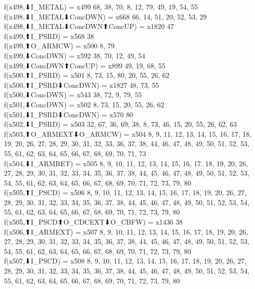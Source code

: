 f(x498,⬇I_METAL) = x499 {68, 38, 70, 8, 12, 79, 49, 19, 54, 55} \\
f(x498,⬇I_METAL⬇ConcDWN) = x668 {66, 14, 51, 20, 52, 53, 29} \\
f(x498,⬇I_METAL⬇ConcDWN⬆ConcUP) = x1820 {47} \\
f(x499,⬆I_PSRD) = x568 {38} \\
f(x499,⬆O_ARMCW) = x500 {8, 79} \\
f(x499,⬇ConcDWN) = x592 {38, 70, 12, 49, 54} \\
f(x499,⬇ConcDWN⬆ConcUP) = x899 {49, 19, 68, 55} \\
f(x500,⬆I_PSRD) = x501 {8, 73, 15, 80, 20, 55, 26, 62} \\
f(x500,⬆I_PSRD⬇ConcDWN) = x1827 {48, 73, 55} \\
f(x500,⬇ConcDWN) = x543 {38, 72, 9, 79, 55} \\
f(x501,⬇ConcDWN) = x502 {8, 73, 15, 20, 55, 26, 62} \\
f(x501,⬇I_PSRD⬇ConcDWN) = x570 {80} \\
f(x502,⬇I_PSRD) = x503 {32, 67, 36, 69, 38, 8, 73, 46, 15, 20, 55, 26, 62, 63} \\
f(x503,⬆O_ARMEXT⬇O_ARMCW) = x504 {8, 9, 11, 12, 13, 14, 15, 16, 17, 18, 19, 20, 26, 27, 28, 29, 30, 31, 32, 33, 36, 37, 38, 44, 46, 47, 48, 49, 50, 51, 52, 53, 55, 61, 62, 63, 64, 65, 66, 67, 68, 69, 70, 71, 73} \\
f(x504,⬇I_ARMRET) = x505 {8, 9, 10, 11, 12, 13, 14, 15, 16, 17, 18, 19, 20, 26, 27, 28, 29, 30, 31, 32, 33, 34, 35, 36, 37, 38, 44, 45, 46, 47, 48, 49, 50, 51, 52, 53, 54, 55, 61, 62, 63, 64, 65, 66, 67, 68, 69, 70, 71, 72, 73, 79, 80} \\
f(x505,⬆I_PSCD) = x506 {8, 9, 10, 11, 12, 13, 14, 15, 16, 17, 18, 19, 20, 26, 27, 28, 29, 30, 31, 32, 33, 34, 35, 36, 37, 38, 44, 45, 46, 47, 48, 49, 50, 51, 52, 53, 54, 55, 61, 62, 63, 64, 65, 66, 67, 68, 69, 70, 71, 72, 73, 79, 80} \\
f(x505,⬆I_PSCD⬆O_CDCEXT⬇O_CBFW) = x1436 {38} \\
f(x506,⬆I_ARMEXT) = x507 {8, 9, 10, 11, 12, 13, 14, 15, 16, 17, 18, 19, 20, 26, 27, 28, 29, 30, 31, 32, 33, 34, 35, 36, 37, 38, 44, 45, 46, 47, 48, 49, 50, 51, 52, 53, 54, 55, 61, 62, 63, 64, 65, 66, 67, 68, 69, 70, 71, 72, 73, 79, 80} \\
f(x507,⬇I_PSCD) = x508 {8, 9, 10, 11, 12, 13, 14, 15, 16, 17, 18, 19, 20, 26, 27, 28, 29, 30, 31, 32, 33, 34, 35, 36, 37, 38, 44, 45, 46, 47, 48, 49, 50, 51, 52, 53, 54, 55, 61, 62, 63, 64, 65, 66, 67, 68, 69, 70, 71, 72, 73, 79, 80} \\
